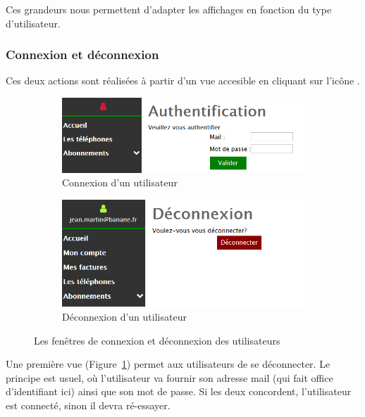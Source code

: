 Ces grandeurs nous permettent d'adapter les affichages en fonction du type d'utilisateur.

\subsubsection{Connexion et déconnexion}
Ces deux actions sont réalisées à partir d'un vue accesible en cliquant sur l'icône \thColor{\faUser}.

\begin{figure}[ht]
  \centering
  \begin{subfigure}{.45\textwidth}
    \centering
    \includegraphics[width=.95\textwidth]{images/Plateforme/connexion}
    \caption{Connexion d'un utilisateur}
    \label{fig:connexion}
  \end{subfigure}\hfill%
  \begin{subfigure}{.45\textwidth}
    \centering
    \includegraphics[width=.95\textwidth]{images/Plateforme/deconnexion}
    \caption{Déconnexion d'un utilisateur}
    \label{fig:deconnexion}
  \end{subfigure}
  \caption{Les fenêtres de connexion et déconnexion des utilisateurs}
\end{figure}

Une première vue (Figure~\ref{fig:connexion}) permet aux utilisateurs de se déconnecter. Le principe est usuel, où l'utilisateur va fournir son adresse mail (qui fait office d'identifiant ici) ainsi que son mot de passe. Si les deux concordent, l'utilisateur est connecté, sinon il devra ré-essayer.

